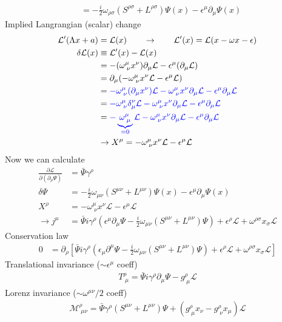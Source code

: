 \documentclass[10pt,a4paper]{report}
\theoremstyle{definition}
\begin{document}
\begin{itemize}
\begin{align}
&=-\frac{i}{2}\omega_{\rho\sigma}\left(S^{\rho\sigma}+L^{\rho\sigma}\right)\Psi(x)-\epsilon^\mu\partial_\mu\Psi(x)
\end{align}
Implied Langrangian (scalar) change
\begin{align}
\mathcal{L}'(\Lambda x+a)
&=\mathcal{L}(x)\qquad\rightarrow\qquad\mathcal{L}'(x)=\mathcal{L}(x-\omega x-\epsilon)\\
\delta\mathcal{L}(x)
&\equiv\mathcal{L}'(x)-\mathcal{L}(x)\\
&=-(\omega^\mu_{\;\nu} x^\nu)\partial_\mu\mathcal{L}-\epsilon^\mu(\partial_\mu\mathcal{L})\\
&=\partial_\mu(-\omega^\mu_{\;\nu} x^\nu\mathcal{L}-\epsilon^\mu \mathcal{L})\\
&=\textcolor{blue}{-\omega^\mu_{\;\nu} (\partial_\mu x^\nu)\mathcal{L}-\omega^\mu_{\;\nu}x^\nu \partial_\mu\mathcal{L}-\epsilon^\mu \partial_\mu\mathcal{L}}\\
&=\textcolor{blue}{-\omega^\mu_{\;\nu} \delta_\mu^\nu\mathcal{L}-\omega^\mu_{\;\nu}x^\nu \partial_\mu\mathcal{L}-\epsilon^\mu \partial_\mu\mathcal{L}}\\
&=\textcolor{blue}{-\underbrace{\omega^\mu_{\;\mu}}_{=0}\mathcal{L}-\omega^\mu_{\;\nu}x^\nu \partial_\mu\mathcal{L}-\epsilon^\mu \partial_\mu\mathcal{L}}\\
&\rightarrow X^\mu=-\omega^\mu_{\;\nu} x^\nu\mathcal{L}-\epsilon^\mu \mathcal{L}
\end{align}
Now we can calculate
\begin{align}
\frac{\partial\mathcal{L}}{\partial(\partial_\rho\Psi)}
&=\bar{\Psi}\gamma^\rho\\
\delta\Psi&=-\frac{i}{2}\omega_{\mu\nu}\left(S^{\mu\nu}+L^{\mu\nu}\right)\Psi(x)-\epsilon^\mu\partial_\mu\Psi(x)\\
X^\rho&=-\omega^\mu_{\;\nu} x^\nu\mathcal{L}-\epsilon^\mu \mathcal{L}\\
\rightarrow j^\mu&=\bar{\Psi}i\gamma^\rho\left(\epsilon^\mu\partial_\mu\Psi-\frac{i}{2}\omega_{\mu\nu}(S^{\mu\nu}+L^{\mu\nu})\Psi\right)+\epsilon^\rho\mathcal{L}+\omega^{\rho\sigma}x_\sigma\mathcal{L}
\end{align}
Conservation law
\begin{align}
0&=\partial_\rho\left[\bar{\Psi}i\gamma^\rho\left(\epsilon_\mu\partial^\mu\Psi-\frac{i}{2}\omega_{\mu\nu}(S^{\mu\nu}+L^{\mu\nu})\Psi\right)+\epsilon^\rho\mathcal{L}+\omega^{\rho\sigma}x_\sigma\mathcal{L}\right]
\end{align}
Translational invariance ($\sim\epsilon^\mu$ coeff)
\begin{align}
T^\rho_{\;\mu}=\bar{\Psi}i\gamma^\rho\partial_\mu\Psi-g^\rho_{\;\mu}\mathcal{L}
\end{align}
Lorenz invariance ($\sim\omega^{\mu\nu}/2$ coeff)
\begin{align}
\mathcal{M}^\rho_{\;\mu\nu}=\bar{\Psi}\gamma^\rho(S^{\mu\nu}+L^{\mu\nu})\Psi+(g^\rho_{\;\mu}x_\nu-g^\rho_{\;\nu}x_\mu)\mathcal{L}
\end{align}


\end{itemize}
\end{document}
